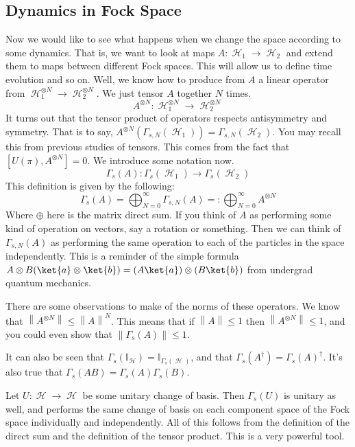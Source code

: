 \documentclass{article}
\DeclareMathOperator{\Hh}{{\mathcal{H}}}
\renewcommand{\norm}[1]{\left\lVert#1\right\rVert}
\begin{document}
\subsection{Dynamics in Fock Space}
Now we would like to see what happens when we change the space according to some dynamics. That is, we want to look at maps $A : \Hh_1 \to \Hh_2$ and extend them to maps between different Fock spaces. This will allow us to define time evolution and so on. Well, we know how to produce from $A$ a linear operator from $\Hh_1^{\otimes N} \to \Hh_2^{\otimes N}$. We just tensor $A$ together $N$ times.
\[A^{\otimes N} : \Hh^{\otimes N}_1 \to \Hh_2^{\otimes N}\]
It turns out that the tensor product of operators respects antisymmetry and symmetry. That is to say, $A^{\otimes N}(\Gamma_{s,N}(\Hh_1)) = \Gamma_{s,N}(\Hh_2)$. You may recall this from previous studies of tensors. This comes from the fact that $[U(\pi),A^{\otimes N}] = 0$. We introduce some notation now.
\begin{equation}
\Gamma_{s}(A) : \Gamma_{s}(\Hh_1) \to \Gamma_s(\Hh_2)
\end{equation}
This definition is given by the following:
\begin{equation}
\Gamma_s(A) = \bigoplus_{N=0}^\infty \Gamma_{s,N}(A) =: \bigoplus_{N=0}^\infty A^{\otimes N}
\end{equation}
Where $\oplus$ here is the matrix direct sum. If you think of $A$ as performing some kind of operation on vectors, say a rotation or something. Then we can think of $\Gamma_{s,N}(A)$ as performing the same operation to each of the particles in the space independently. This is a reminder of the simple formula $A\otimes B(\ket{a}\otimes\ket{b}) = (A\ket{a})\otimes(B\ket{b})$ from undergrad quantum mechanics.

There are some observations to make of the norms of these operators. We know that $\norm{A^{\otimes N}} \leq \norm{A}^N$. This means that if $\norm{A} \leq 1$ then $\norm{A^{\otimes N}} \leq 1$, and you could even show that $\norm{\Gamma_s(A)} \leq 1$.

It can also be seen that $\Gamma_s(\mathbb{I}_{\Hh}) = \mathbb{I}_{\Gamma_s(\Hh)}$, and that $\Gamma_s(A^\dagger) = \Gamma_s(A)^\dagger$. It's also true that $\Gamma_s(AB) = \Gamma_s(A)\Gamma_s(B)$.

Let $U : \Hh \to \Hh$ be some unitary change of basis. Then $\Gamma_s(U)$ is unitary as well, and performs the same change of basis on each component space of the Fock space individually and independently. All of this follows from the definition of the direct sum and the definition of the tensor product. This is a very powerful tool.
\end{document}
